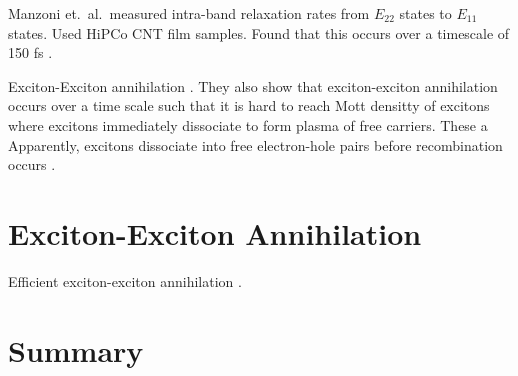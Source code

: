 Manzoni et.\ al.\ measured intra-band relaxation rates from $E_{22}$ states to $E_{11}$ states. Used HiPCo CNT film samples.  Found that this occurs over a timescale of 150 fs \cite{manzoni2005intersubband}.

Exciton-Exciton annihilation \cite{valkunas2006exciton, yuma2013biexciton}.
They also show that exciton-exciton annihilation occurs over a time scale such that it is hard to reach Mott densitty of excitons where excitons immediately dissociate to form plasma of free carriers. These a
Apparently, excitons dissociate into free electron-hole pairs before recombination occurs \cite{kumamoto2014spontaneous}.
\section{Exciton-Exciton Annihilation}
Efficient exciton-exciton annihilation \cite{murakami2009existence}.

\section{Summary}
